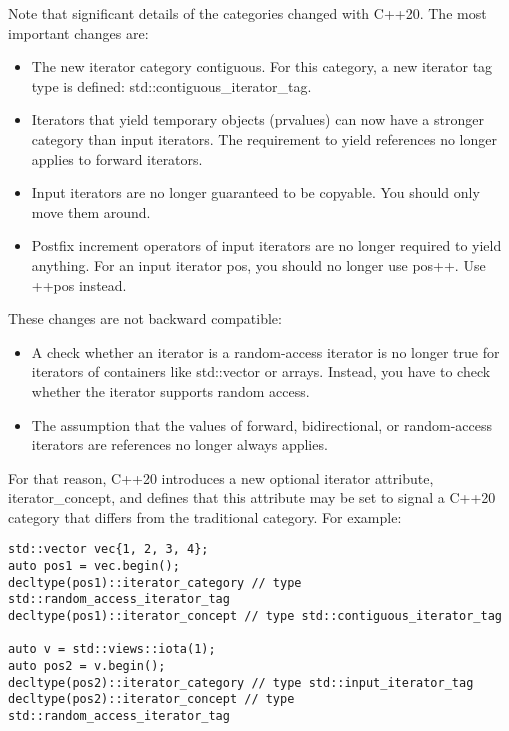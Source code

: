 Note that significant details of the categories changed with C++20. The most important changes are:

\begin{itemize}
\item
The new iterator category contiguous. For this category, a new iterator tag type is defined: std::contiguous\_iterator\_tag.

\item
Iterators that yield temporary objects (prvalues) can now have a stronger category than input iterators. The requirement to yield references no longer applies to forward iterators.

\item
Input iterators are no longer guaranteed to be copyable. You should only move them around.

\item
Postfix increment operators of input iterators are no longer required to yield anything. For an input iterator pos, you should no longer use pos++. Use ++pos instead.
\end{itemize}

These changes are not backward compatible:

\begin{itemize}
\item
A check whether an iterator is a random-access iterator is no longer true for iterators of containers like std::vector or arrays. Instead, you have to check whether the iterator supports random access.

\item
The assumption that the values of forward, bidirectional, or random-access iterators are references no longer always applies.
\end{itemize}

For that reason, C++20 introduces a new optional iterator attribute, iterator\_concept, and defines that this attribute may be set to signal a C++20 category that differs from the traditional category. For example:

\begin{lstlisting}[style=styleCXX]
std::vector vec{1, 2, 3, 4};
auto pos1 = vec.begin();
decltype(pos1)::iterator_category // type std::random_access_iterator_tag
decltype(pos1)::iterator_concept // type std::contiguous_iterator_tag

auto v = std::views::iota(1);
auto pos2 = v.begin();
decltype(pos2)::iterator_category // type std::input_iterator_tag
decltype(pos2)::iterator_concept // type std::random_access_iterator_tag
\end{lstlisting}


